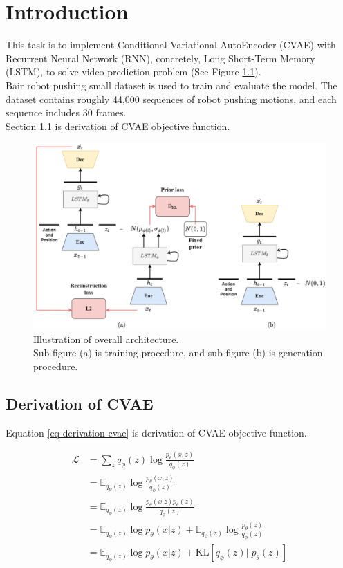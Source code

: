 \chapter{Introduction}
\indent
	This task is to implement Conditional Variational AutoEncoder (CVAE) with Recurrent Neural Network (RNN), 
	concretely, Long Short-Term Memory (LSTM), to solve video prediction problem (See Figure \ref{architecture}). \\
	Bair robot pushing small dataset is used to train and evaluate the model. 
	The dataset contains roughly 44,000 sequences of robot pushing motions, and each sequence includes 30 frames. \\
	Section \ref{sec-derivation-cvae} is derivation of CVAE objective function.

	\begin{figure}[H]
		\centering
		\includegraphics[scale=0.5]{img/architecture.png}
		\caption{Illustration of overall architecture.\\Sub-figure (a) is training procedure, and sub-figure (b) is generation procedure.}
		\label{architecture}
	\end{figure}

\section{Derivation of CVAE}\label{sec-derivation-cvae}
\indent
	Equation \ref{eq-derivation-cvae} is derivation of CVAE objective function.

\begin{equation}\label{eq-derivation-cvae}
	\begin{aligned}
		\mathcal{L} & = \sum_z q_\phi(z)\log\frac{p_\theta(x, z)}{q_\phi(z)} \\
		& = \mathbb{E}_{q_\phi(z)}\log\frac{p_\theta(x, z)}{q_\phi(z)} \\
		& = \mathbb{E}_{q_\phi(z)}\log\frac{p_\theta(x | z)p_\theta(z)}{q_\phi(z)} \\
		& = \mathbb{E}_{q_\phi(z)}\log p_\theta(x | z) + \mathbb{E}_{q_\phi(z)}\log\frac{p_\theta(z)}{q_\phi(z)} \\
		& = \mathbb{E}_{q_\phi(z)}\log p_\theta(x | z) + \text{KL}[q_\phi(z) || p_\theta(z)]
	\end{aligned}
\end{equation}
